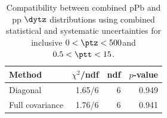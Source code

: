 \begin{table}[htp!]
\centering
\begin{tabular}{|l|r|r|r|}
\hline
Method & $\chi^2$/ndf & ndf & $p$-value \\
\hline
Diagonal & 1.65/6 & 6 & 0.949 \\
Full covariance & 1.76/6 & 6 & 0.941 \\
\hline
\end{tabular}
\caption{Compatibility between combined pPb and pp $\dytz$ distributions using combined statistical and systematic uncertainties for inclusive $0 < \ptz < 500$\GeV and $0.5 < \ptt < 15$\GeV.}
\label{table:chisq_deta}
\end{table}
